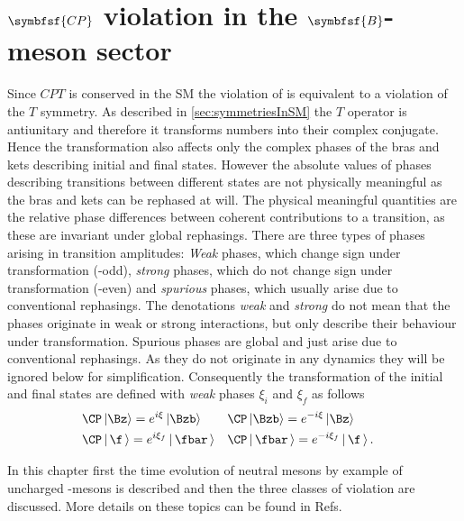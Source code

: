 \chapter[head={\CP violation in the $B$-meson sector},tocentry={$\symbfsf{C{}P}$ violation in the $\symbfsf{B}$-meson sector}]
{$\symbfsf{C{}P}$ violation in the $\symbfsf{B}$-meson sector}
\label{chap:CPV}

Since $CPT$ is conserved in the \ac{SM} the violation of \CP is equivalent to a violation of the $T$ symmetry.
As described in \cref{sec:symmetriesInSM} the $T$ operator is antiunitary and therefore it transforms numbers into their complex conjugate.
Hence the \CP transformation also affects only the complex phases of the bras and kets describing initial and final states.
However the absolute values of phases describing transitions between different states are not physically meaningful as the bras and kets can be rephased at will.
The physical meaningful quantities are the relative phase differences between coherent contributions to a transition, as these are invariant under global rephasings.
There are three types of phases arising in transition amplitudes:
\emph{Weak} phases, which change sign under \CP transformation (\CP-odd), \emph{strong} phases, which do not change sign under \CP transformation (\CP-even) and \emph{spurious} phases, which usually arise due to conventional rephasings.
The denotations \emph{weak} and \emph{strong} do not mean that the phases originate in weak or strong interactions, but only describe their behaviour under \CP transformation.
Spurious phases are global and just arise due to conventional rephasings.
As they do not originate in any dynamics they will be ignored below for simplification.
Consequently the \CP transformation of the initial and final states are defined with \emph{weak} phases $\xi_i$ and $\xi_f$ as follows
\begin{equation}
\begin{aligned}
&\CP\left|\Bz\right> =e^{i\xi}\left|\Bzb\right>&&\CP\left|\Bzb\right>=e^{-i\xi}\left|\Bz\right>&\\
&\CP\left|\,\f\,\right> =e^{i\xi_f}\left|\,\fbar\,\right>&&\CP\left|\,\fbar\,\right>=e^{-i\xi_f}\left|\,\f\,\right>.& \label{eq:CPTransInitFinal}
\end{aligned}
\end{equation}

In this chapter first the time evolution of neutral mesons by example of uncharged \B-mesons is described and then the three classes of \CP violation are discussed. More details on these topics can be found in Refs.~\cite{Branco:396964,Bigi:1295518}


